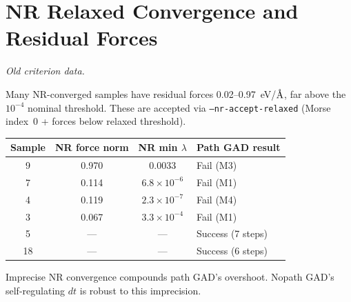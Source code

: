 \documentclass[11pt,a4paper]{article}
\newcommand{\eval}{\lambda}
\newcommand{\angstrom}{\text{\r{A}}}
\begin{document}
\section{NR Relaxed Convergence and Residual Forces}
\label{app:residual}

\textit{Old criterion data.}

Many NR-converged samples have residual forces 0.02--0.97~eV/$\angstrom$,
far above the $10^{-4}$ nominal threshold.  These are accepted via
\texttt{--nr-accept-relaxed} (Morse index~0 + forces below relaxed threshold).

\begin{center}
\begin{tabular}{cccl}
\toprule
Sample & NR force norm & NR min $\eval$ & Path GAD result \\
\midrule
9  & 0.970 & 0.0033 & Fail (M3) \\
7  & 0.114 & $6.8\times10^{-6}$ & Fail (M1) \\
4  & 0.119 & $2.3\times10^{-7}$ & Fail (M4) \\
3  & 0.067 & $3.3\times10^{-4}$ & Fail (M1) \\
5  & --- & --- & Success (7 steps) \\
18 & --- & --- & Success (6 steps) \\
\bottomrule
\end{tabular}
\end{center}

Imprecise NR convergence compounds path GAD's overshoot.
Nopath GAD's self-regulating $dt$ is robust to this imprecision.

\end{document}
